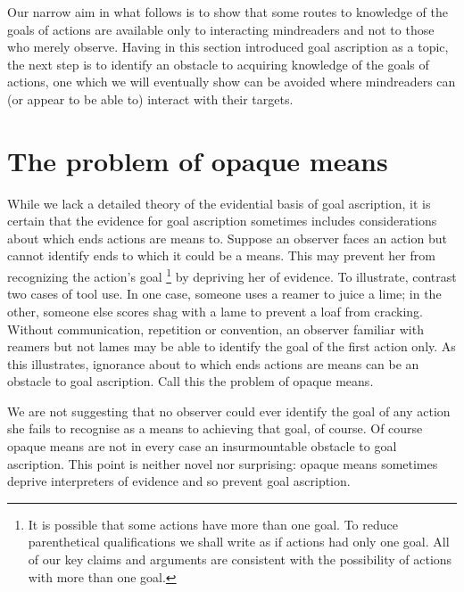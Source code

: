 \documentclass[14pt,a4paper]{extarticle}
\begin{document}
Our narrow aim in what follows is to show that some routes to knowledge of the goals of actions 
are available only to interacting mindreaders
and not to those who merely observe.
Having in this section introduced goal ascription as a topic,
the next step is to identify an obstacle to acquiring knowledge of the goals of actions,
one which we will eventually show can be avoided where mindreaders can (or appear to be able to) interact with their targets.


\section{The problem of opaque means}
\label{sec:opaque_means}

While we lack a detailed theory of the evidential basis of goal ascription,
it is certain that the evidence for goal ascription sometimes includes considerations about which ends actions are means to.
Suppose an observer faces an action but cannot identify ends to which it could be a means.
This may prevent her from recognizing the action's goal%
\footnote{
It is possible that some actions have more than one goal.
To reduce parenthetical qualifications we shall write as if actions had only one goal.  
All of our key claims and arguments are consistent with the possibility of actions with more than one goal.
} 
 by depriving her of evidence.
To illustrate, contrast two cases of tool use.
In one case, someone uses a reamer to  juice  a lime; in the other, someone else scores shag with a lame to prevent a loaf from cracking.
Without communication, repetition or convention,
an observer familiar with reamers but not lames 
may be able to identify the goal of the first action only.
As this illustrates, ignorance about to which ends actions are means can be an obstacle to goal ascription.%
Call this the problem of opaque means.

We are not suggesting that no observer could ever identify the goal of any action she fails to recognise as a means to achieving that goal, of course.
Of course opaque means are not in every case an insurmountable obstacle to goal ascription.
This point is neither novel nor surprising:
opaque means sometimes  deprive interpreters of evidence and so prevent goal ascription.
\end{document}
